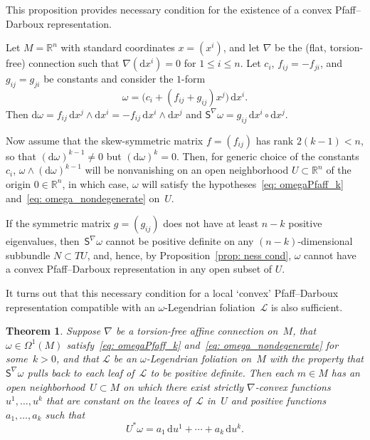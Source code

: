 \documentclass[10pt,a4paper]{amsart}
\renewcommand{\d}{\mathrm{d}}%
\newcommand{\cL}{{\mathcal L}}
\newcommand{\Ss}{\mathsf{S}}
\newcommand{\w}{\wedge}
\numberwithin{equation}{section}
\newtheorem{Theorem}{Theorem}[section]
\begin{document}
This proposition provides necessary condition for the existence
of a convex Pfaff--Darboux representation.

\begin{Example}\label{ex: Obstruction}
Let $M=\mathbb{R}^n$ with standard coordinates $x=(x^i)$,
and let $\nabla$ be the (flat, torsion-free) connection
such that $\nabla(\d x^i)=0$ for $1\le i\le n$.
Let $c_i$, $f_{ij}=-f_{ji}$, and $g_{ij}=g_{ji}$
be constants and consider the $1$-form
\[
\omega = \bigl(c_i + (f_{ij}+g_{ij})x^j)\,\d x^i.
\]
Then $\d\omega= f_{ij}\,\d x^j\w\d x^i = - f_{ij}\,\d x^i\w\d x^j$
and $\Ss^\nabla\omega = g_{ij}\,\d x^i\circ\d x^j$.

Now assume that the skew-symmetric matrix $f = (f_{ij})$
has rank $2(k{-}1)<n$, so that $(\d\omega)^{k-1}\not=0$
but $(\d\omega)^{k}=0$.
Then, for generic choice of the constants $c_i$,
$\omega\w(\d\omega)^{k-1}$ will be nonvanishing on an open neighborhood $U\subset\mathbb{R}^n$ of the origin $0\in\mathbb{R}^n$,
in which case, $\omega$ will satisfy the hypotheses~\eqref{eq: omegaPfaff_k}
and~\eqref{eq: omega_nondegenerate} on~$U$.

If the symmetric matrix $g = (g_{ij})$
does not have at least $n{-}k$ positive eigenvalues,
then~$\Ss^\nabla\omega$ cannot be positive definite on
any $(n{-}k)$-dimensional subbundle $N\subset TU$, and, hence,
by Proposition~\ref{prop: ness cond}, $\omega$ cannot have a convex Pfaff--Darboux
representation in any open subset of $U$.
\end{Example}

It turns out that this necessary condition
for a local `convex' Pfaff--Darboux representation compatible
with an $\omega$-Legendrian foliation~$\cL$ is also sufficient.


\begin{Theorem}\label{thm: main}
Suppose $\nabla$ be a torsion-free affine
connection on~$M$, that $\omega\in\Omega^1(M)$
satisfy~\eqref{eq: omegaPfaff_k} and~\eqref{eq: omega_nondegenerate}
for some~$k>0$, and that $\cL$ be an $\omega$-Legendrian
foliation on~$M$ with the property that $\Ss^\nabla\omega$
pulls back to each leaf of~$\cL$ to be positive definite.
Then each $m\in M$ has an open neighborhood~$U\subset M$
on which there exist strictly $\nabla$-convex functions~$u^1,\ldots,u^k$
that are constant on the leaves of~$\cL$ in~$U$
and positive functions~$a_1,\ldots, a_k$ such that
\begin{equation*}
U^*\omega = a_1\,\d u^1 + \cdots + a_k\,\d u^k.
\end{equation*}
\end{Theorem}
\end{document}
